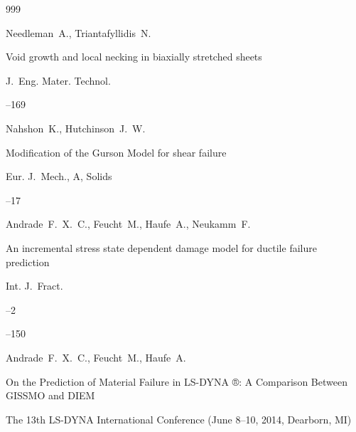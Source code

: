 \begin{thebibliography}{999}

\by Needleman~A., Triantafyllidis~N. 

\paper Void growth and local necking in biaxially stretched sheets

\jour J.~Eng. Mater. Technol.




--169






\by Nahshon~K., Hutchinson~J.~W. 

\paper Modification of the Gurson Model for shear failure

\jour Eur. J.~Mech., A, Solids




--17






\by Andrade~F.~X.~C., Feucht~M., Haufe~A., Neukamm~F. 

\paper An incremental stress state dependent damage model for ductile failure prediction

\jour Int. J.~Fract.



--2

--150






\by Andrade~F.~X.~C., Feucht~M., Haufe~A.

\thesis On the Prediction of Material Failure in LS-DYNA ®: A Comparison Between GISSMO and DIEM

\thesisinfo The 13th LS-DYNA International Conference (June 8--10, 2014, Dearborn, MI)



\end{thebibliography}
